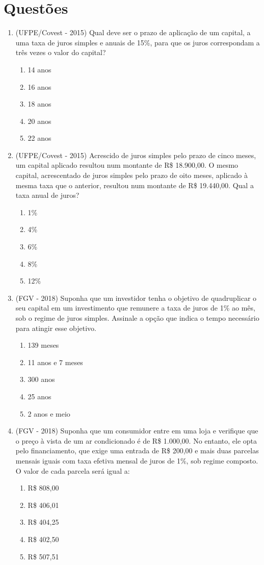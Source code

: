 \section{Questões}
 \begin{enumerate}

  \item (UFPE/Covest - 2015) Qual deve ser o prazo de aplicação de um capital, a uma taxa de juros simples e anuais de 15\%, para que os juros correspondam a três vezes o valor do capital?
  \begin{enumerate}
  \item 14 anos
  \item 16 anos
  \item 18 anos
  \item 20 anos
  \item 22 anos
  \end{enumerate}
  
  \item (UFPE/Covest - 2015) Acrescido de juros simples pelo prazo de cinco meses, um capital aplicado resultou num montante de R\$ 18.900,00. O mesmo capital, acrescentado de juros simples pelo prazo de oito meses, aplicado à mesma taxa que o anterior, resultou num montante de R\$ 19.440,00. Qual a taxa anual de juros?
  \begin{enumerate}
  \item 1\%
  \item 4\%
  \item 6\%
  \item 8\%
  \item 12\%
  \end{enumerate}

  \item (FGV - 2018) Suponha que um investidor tenha o objetivo de quadruplicar o seu capital em um investimento que remunere a taxa de juros de 1\% ao mês, sob o regime de juros simples. Assinale a opção que indica o tempo necessário para atingir esse objetivo.
  \begin{enumerate}
  \item 139 meses
  \item 11 anos e 7 meses
  \item 300 anos
  \item 25 anos
  \item 2 anos e meio
  \end{enumerate}

  \item (FGV - 2018) Suponha que um consumidor entre em uma loja e verifique que o preço à vista de um ar condicionado é de R\$ 1.000,00. No entanto, ele opta pelo financiamento, que exige uma entrada de R\$ 200,00 e mais duas parcelas mensais iguais com taxa efetiva mensal de juros de 1\%, sob regime composto. O valor de cada parcela será igual a:
  \begin{enumerate}
  \item R\$ 808,00
  \item R\$ 406,01
  \item R\$ 404,25
  \item R\$ 402,50
  \item R\$ 507,51
  \end{enumerate}


\end{enumerate}
